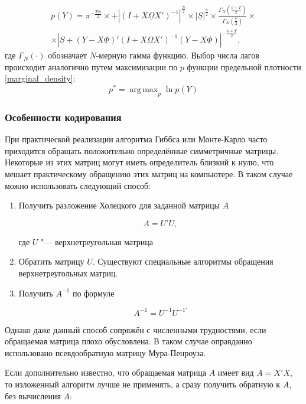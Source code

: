 \documentclass[11pt]{article} %
\DeclareMathOperator*{\argmax}{arg\,max}
\newcommand{\prior}{\underline}
\begin{document}
\begin{multline}
p(Y)=\pi^{-\frac{Tm}{2}}\times +\left |(I+X\prior{\Omega} X')^{-1}\right|^{\frac{N}{2}}\times |\prior{S}|^{\frac{\prior{\nu}}{2}}\times \frac{\Gamma_N(\frac{\prior{\nu}+T}{2})}{\Gamma_N(\frac{\prior{\nu}}{2})}\times \\ \times
\left|\prior{S}+(Y-X\prior{\Phi})'(I+X\prior{\Omega} X')^{-1}(Y-X\prior{\Phi})\right|^{-\frac{\prior{\nu}+T}{2}},\label{marginal_density}
\end{multline}
где $\Gamma_N(\cdot)$ обозначает $N$-мерную гамма функцию.
Выбор числа лагов происходит аналогично путем максимизации по $p$ функции предельной плотности \eqref{marginal_density}:
\begin{equation}
p^*=\argmax_{p} \ln p(Y)
\end{equation}


\subsubsection{Особенности кодирования}

При практической реализации алгоритма Гиббса или Монте-Карло часто
приходится обращать положительно определённые симметричные матрицы. Некоторые из этих матриц могут иметь определитель близкий к нулю, что мешает практическому обращению этих матриц на компьютере.
В таком случае можно использовать следующий способ:


\begin{enumerate}

\item Получить разложение Холецкого для заданной матрицы $A$

\[
A=U'U,
\]

где $U$ "--- верхнетреугольная матрица

\item Обратить матрицу $U$. Существуют специальные алгоритмы обращения
верхнетреугольных матриц.

\item Получить $A^{-1}$ по формуле

\[
A^{-1}=U^{-1}U^{-1\prime}
\]

\end{enumerate}


Однако даже данный способ сопряжён с численными трудностями, если
обращаемая матрица плохо обусловлена. В таком случае оправданно использовано
псевдообратную матрицу Мура-Пенроуза.

Если дополнительно известно, что обращаемая матрица $A$ имеет вид $A=X'X$, то изложенный алгоритм лучше не применять, а сразу получить обратную к $A$, без вычисления $A$:
\end{document}
